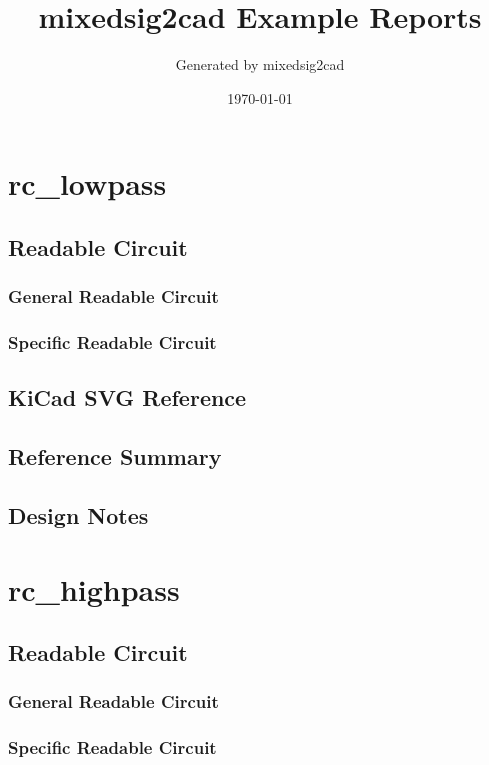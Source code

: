 \documentclass[11pt]{article}
\title{mixedsig2cad Example Reports}
\author{Generated by mixedsig2cad}
\date{\today}
\begin{document}
\maketitle
\tableofcontents
\section{rc\_lowpass}
\subsection{Readable Circuit}
\subsubsection{General Readable Circuit}

\subsubsection{Specific Readable Circuit}

\subsection{KiCad SVG Reference}
\subsection{Reference Summary}

\subsection{Design Notes}

\clearpage
\section{rc\_highpass}
\subsection{Readable Circuit}
\subsubsection{General Readable Circuit}

\subsubsection{Specific Readable Circuit}

\end{document}
